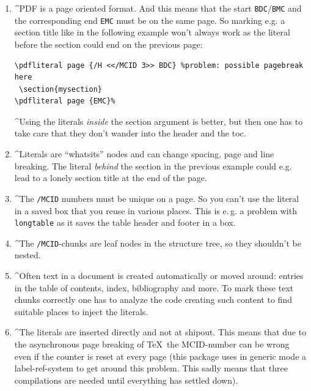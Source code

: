 \documentclass[DIV=12,parskip=half-,bibliography=totoc]{scrartcl}
\newcommand\PDF{PDF}
\begin{document}
\begin{enumerate}[beginpenalty=10000]
  \item \TagP^\PDF{} is a page oriented format. And this means that the start \texttt{BDC}/\texttt{BMC}  and the corresponding end \texttt{EMC} must be on the same page.
  So marking e.g. a section title like in the following example won't always work as the literal before the section could end on the previous page:\TagPend


\begin{lstlisting}
\pdfliteral page {/H <</MCID 3>> BDC} %problem: possible pagebreak here
 \section{mysection}
\pdfliteral page {EMC}%
\end{lstlisting}


  \TagP^Using the literals \emph{inside} the section argument is better, but then one has to take care that they don't wander into the header and the toc.\Pmeti

  \item
  \TagP^Literals are \enquote{whatsits} nodes and can change spacing, page and line breaking. The literal \emph{behind} the section in the previous example could e.g. lead to a lonely section title at the end of the page.\Pmeti

  \item
   \TagP^The \texttt{/MCID} numbers must be unique on a page. So you can't use the literal in a saved box that you reuse in various places. This is e.\,g. a problem with \texttt{longtable} as it saves the table header and footer in a box.\Pmeti

  \item
  \TagP^The  \texttt{/MCID}-chunks are leaf nodes in the structure tree, so they shouldn't be nested.\Pmeti

  \item
  \TagP^Often text in a document is created automatically or moved around: entries in the table of contents, index, bibliography and more. To mark these text chunks correctly one has to analyze the code creating such content to find suitable places to inject the literals.\Pmeti

  \item
  \TagP^The literals are inserted directly and not at shipout. This means that due to the asynchronous page breaking of \TeX\ the MCID-number can be wrong even if the counter is reset at every page (this package uses in generic mode a label-ref-system to get around this problem. This sadly means that three compilations are needed until everything has settled down).\Pmeti


\end{enumerate}
\end{document}
